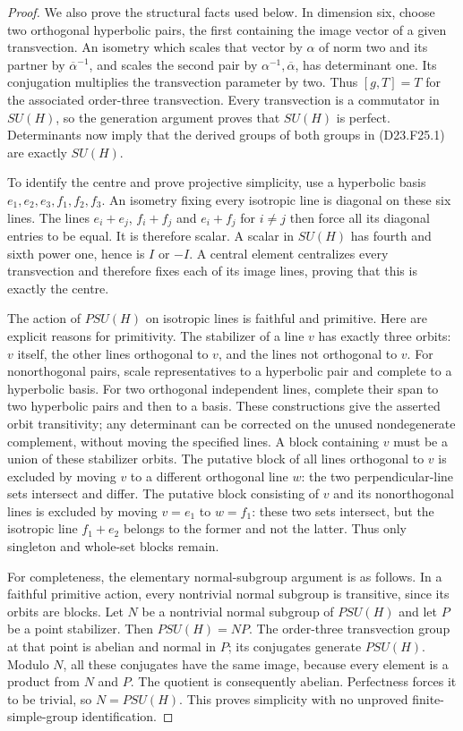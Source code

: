 \begin{proof}
We also prove the structural facts used below.  In dimension
six, choose two orthogonal hyperbolic pairs, the first containing
the image vector of a given transvection.  An isometry which
scales that vector by $\alpha$ of norm two and its partner by
$\overline\alpha^{-1}$, and scales the second pair by
$\alpha^{-1},\overline\alpha$, has determinant one.
Its conjugation multiplies the transvection parameter by two.
Thus $[g,T]=T$ for the associated order-three transvection.
Every transvection is a commutator in $SU(H)$, so the generation
argument proves that $SU(H)$ is perfect.  Determinants now imply
that the derived groups of both groups in (D23.F25.1) are exactly
$SU(H)$.

To identify the centre and prove projective simplicity, use a
hyperbolic basis $e_1,e_2,e_3,f_1,f_2,f_3$.
An isometry fixing every isotropic line is diagonal on these
six lines.  The lines $e_i+e_j$, $f_i+f_j$ and $e_i+f_j$ for
$i\ne j$ then force all its diagonal entries to be equal.
It is therefore scalar.  A scalar in $SU(H)$ has fourth and
sixth power one, hence is $I$ or $-I$.  A central element
centralizes every transvection and therefore fixes each of
its image lines, proving that this is exactly the centre.

The action of $PSU(H)$ on isotropic lines is faithful and
primitive.  Here are explicit reasons for primitivity.  The
stabilizer of a line $v$ has exactly three orbits: $v$ itself,
the other lines orthogonal to $v$, and the lines not orthogonal
to $v$.  For nonorthogonal pairs, scale representatives to a
hyperbolic pair and complete to a hyperbolic basis.  For two
orthogonal independent lines, complete their span to two
hyperbolic pairs and then to a basis.  These constructions
give the asserted orbit transitivity; any determinant can be
corrected on the unused nondegenerate complement, without
moving the specified lines.  A block containing $v$ must be
a union of these stabilizer orbits.  The putative block of
all lines orthogonal to $v$ is excluded by moving $v$ to a
different orthogonal line $w$: the two perpendicular-line
sets intersect and differ.  The putative block consisting of
$v$ and its nonorthogonal lines is excluded by moving $v=e_1$
to $w=f_1$: these two sets intersect, but the isotropic line
$f_1+e_2$ belongs to the former and not the latter.
Thus only singleton and whole-set blocks remain.

For completeness, the elementary normal-subgroup argument is
as follows.  In a faithful primitive action, every nontrivial
normal subgroup is transitive, since its orbits are blocks.
Let $N$ be a nontrivial normal subgroup of $PSU(H)$ and let
$P$ be a point stabilizer.  Then $PSU(H)=NP$.  The order-three
transvection group at that point is abelian and normal in $P$;
its conjugates generate $PSU(H)$.  Modulo $N$, all these
conjugates have the same image, because every element is a
product from $N$ and $P$.  The quotient is consequently
abelian.  Perfectness forces it to be trivial, so $N=PSU(H)$.
This proves simplicity with no unproved finite-simple-group
identification.


\end{proof}
